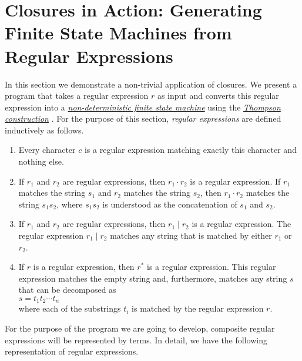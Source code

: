 \section[Closures in Action]{Closures in Action: Generating Finite State Machines from Regular Expressions}
In this section we demonstrate a non-trivial application of closures.  We present a program that
takes a regular expression $r$ as input and  converts this regular expression into a
\href{http://en.wikipedia.org/wiki/Nondeterministic_finite_automaton}{\emph{non-deterministic finite state machine}} 
using the 
\href{http://en.wikipedia.org/wiki/Thompson's_construction_algorithm}{\emph{Thompson construction}}
\cite{hopcroft:06}.  For the purpose of this section, \emph{regular expressions} are defined inductively as
follows.
\begin{enumerate}
\item Every character $c$ is a regular expression matching exactly this character and
      nothing else.
\item If $r_1$ and $r_2$ are regular expressions,  then $r_1 \cdot r_2$ is a regular
      expression.  If $r_1$ matches the string $s_1$ and $r_2$ matches the string $s_2$,
      then $r_1 \cdot r_2$ matches the string $s_1s_2$, where $s_1s_2$ is understood as
      the concatenation of $s_1$ and $s_2$.
\item If $r_1$ and $r_2$ are regular expressions,  then $r_1 \mid r_2$ is a regular
      expression.  The regular expression $r_1 \mid r_2$ matches any string that is matched
      by either $r_1$ or $r_2$.
\item If $r$ is a regular expression, then $r^*$ is a regular expression.
      This regular expression matches the empty string and, furthermore, matches any string
      $s$ that can be decomposed as
      \\[0.2cm]
      \hspace*{1.3cm}
      $s = t_1 t_2 \cdots t_n$
      \\[0.2cm]
      where each of the substrings $t_i$ is matched by the regular expression $r$.
\end{enumerate}
For the purpose of the program we are going to develop, composite regular expressions will be
represented by terms.  In detail, we have the following representation of regular
expressions.
